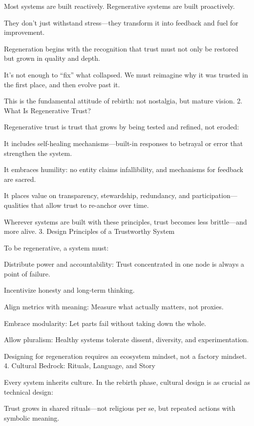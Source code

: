\documentclass[11pt,oneside]{book}
\begin{document}
Most systems are built reactively. Regenerative systems are built proactively.

    They don’t just withstand stress—they transform it into feedback and fuel for improvement.

    Regeneration begins with the recognition that trust must not only be restored but grown in quality and depth.

    It’s not enough to “fix” what collapsed. We must reimagine why it was trusted in the first place, and then evolve past it.

This is the fundamental attitude of rebirth: not nostalgia, but mature vision.
2. What Is Regenerative Trust?

Regenerative trust is trust that grows by being tested and refined, not eroded:

    It includes self-healing mechanisms—built-in responses to betrayal or error that strengthen the system.

    It embraces humility: no entity claims infallibility, and mechanisms for feedback are sacred.

    It places value on transparency, stewardship, redundancy, and participation—qualities that allow trust to re-anchor over time.

Wherever systems are built with these principles, trust becomes less brittle—and more alive.
3. Design Principles of a Trustworthy System

To be regenerative, a system must:

    Distribute power and accountability: Trust concentrated in one node is always a point of failure.

    Incentivize honesty and long-term thinking.

    Align metrics with meaning: Measure what actually matters, not proxies.

    Embrace modularity: Let parts fail without taking down the whole.

    Allow pluralism: Healthy systems tolerate dissent, diversity, and experimentation.

Designing for regeneration requires an ecosystem mindset, not a factory mindset.
4. Cultural Bedrock: Rituals, Language, and Story

Every system inherits culture. In the rebirth phase, cultural design is as crucial as technical design:

    Trust grows in shared rituals—not religious per se, but repeated actions with symbolic meaning.
\end{document}
